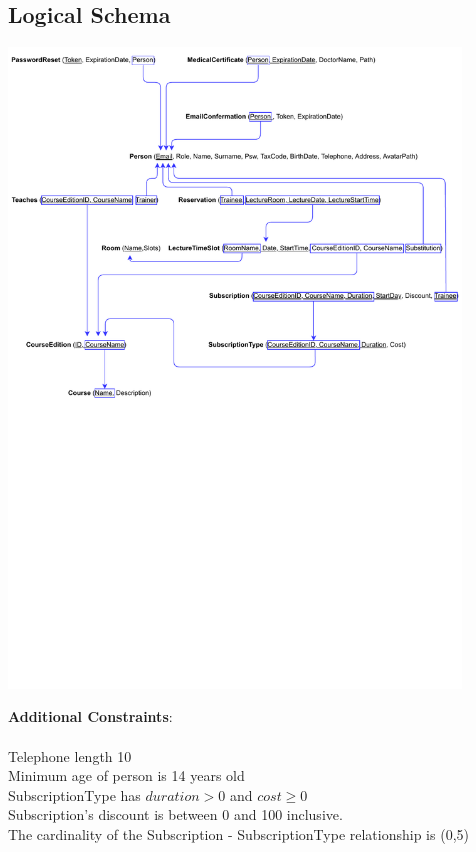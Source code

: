 \subsection{Logical Schema}
    \begin{center}
		\includegraphics[width=0.9\textwidth,bb = 0 380 700 850,clip=true]{resources/Logical_Schema.pdf}
    \end{center}

    
	  \textbf{Additional Constraints}:\\
  \\
    Telephone length 10\\
    Minimum age of person is 14 years old\\
    SubscriptionType has $duration > 0$ and $cost \ge 0$\\
    Subscription's discount is between 0 and 100 inclusive.\\
    The cardinality of the Subscription - SubscriptionType relationship is (0,5)